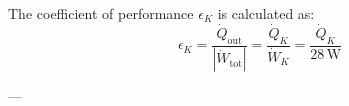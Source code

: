 The coefficient of performance \( \epsilon_K \) is calculated as:  
\[
\epsilon_K = \frac{\dot{Q}_{\text{out}}}{|\dot{W}_{\text{tot}}|} = \frac{\dot{Q}_K}{\dot{W}_K} = \frac{\dot{Q}_K}{28 \, \text{W}}
\]

---